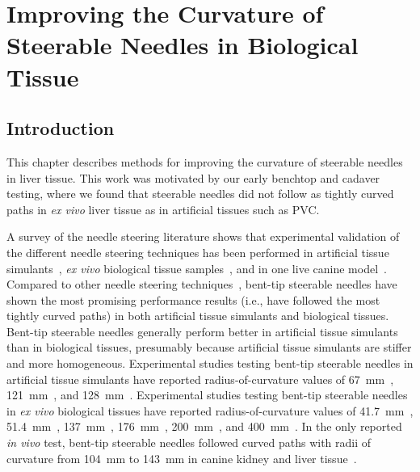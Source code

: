 \chapter[Improving Needle Curvature]{Improving the Curvature of Steerable Needles in Biological Tissue}

\section{Introduction}
This chapter describes methods for improving the curvature of steerable needles in liver tissue. This work was motivated by our early benchtop and cadaver testing, where we found that steerable needles did not follow as tightly curved paths in \textit{ex vivo} liver tissue as in artificial tissues such as PVC. 

A survey of the needle steering literature shows that experimental validation of the different needle steering techniques has been performed in artificial tissue simulants~\cite{DiMaio2005,Mallapragada2009,Okazawa2005,Ayvali2012,Datla2014,Ryu2014,Ko2013,Swaney2013,vandeBerg2015,Rucker2013,Patil2014}, \textit{ex vivo} biological tissue samples~\cite{Glozman2007,Swaney2013,Rucker2013,Majewicz2012,Patil2014,Burdette2010}, and in one live canine model~\cite{Majewicz2012}. Compared to other needle steering techniques~\cite{DiMaio2005,Mallapragada2009,Okazawa2005,Ryu2014,Ko2013}, bent-tip steerable needles have shown the most promising performance results (i.e., have followed the most tightly curved paths) in both artificial tissue simulants and biological tissues. Bent-tip steerable needles generally perform better in artificial tissue simulants than in biological tissues, presumably because artificial tissue simulants are stiffer and more homogeneous. Experimental studies testing bent-tip steerable needles in artificial tissue simulants have reported radius-of-curvature values of 67~mm~\cite{Patil2014}, 121~mm~\cite{Swaney2013}, and 128~mm~\cite{Rucker2013}. Experimental studies testing bent-tip steerable needles in \textit{ex vivo} biological tissues have reported radius-of-curvature values of 41.7~mm~\cite{Majewicz2010}, 51.4~mm~\cite{Adebar2014}, 137~mm~\cite{Patil2014}, 176~mm~\cite{Swaney2013}, 200~mm~\cite{Majewicz2012}, and 400~mm~\cite{Rucker2013}. In the only reported \textit{in vivo} test, bent-tip steerable needles followed curved paths with radii of curvature from 104~mm to 143~mm in canine kidney and liver tissue~\cite{Majewicz2012}.

